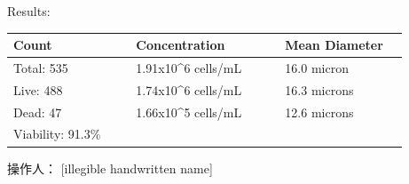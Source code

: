 \documentclass[UTF8,10pt,a4paper,fontset=fandol]{ctexart}
\newcommand{\fieldvalue}[1]{#1}
\newcommand{\handwritten}[1]{#1}
\begin{document}
\medskip
Results:

\medskip
\small
\begin{tabular}{@{}p{0.29\linewidth}p{0.34\linewidth}p{0.29\linewidth}@{}}
\textbf{Count} & \textbf{Concentration} & \textbf{Mean Diameter} \\
\hline
Total:
\fieldvalue{535}
&
\fieldvalue{1.91x10\textasciicircum 6 cells/mL}
&
\fieldvalue{16.0 micron}
\\
Live:
\fieldvalue{488}
&
\fieldvalue{1.74x10\textasciicircum 6 cells/mL}
&
\fieldvalue{16.3 microns}
\\
Dead:
\fieldvalue{47}
&
\fieldvalue{1.66x10\textasciicircum 5 cells/mL}
&
\fieldvalue{12.6 microns}
\\
Viability:
\fieldvalue{91.3\%}
&
&
\end{tabular}
\normalsize

\bigskip

\noindent

\hfill

\medskip

\noindent

\hfill

\vfill

\noindent 操作人：
\fieldvalue{\handwritten{[illegible handwritten name]}}
\end{document}
